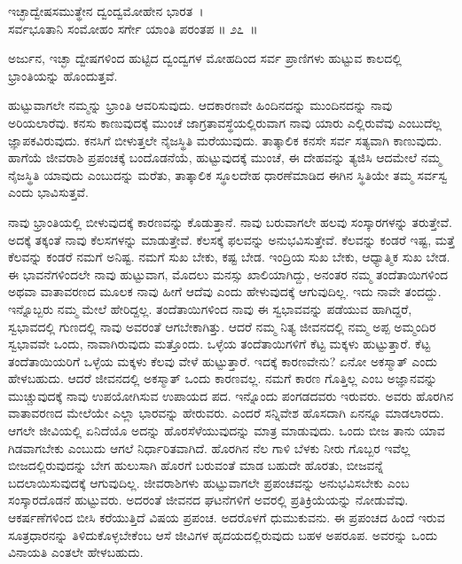 \begin{shloka}
ಇಚ್ಛಾದ್ವೇಷಸಮುತ್ಥೇನ ದ್ವಂದ್ವಮೋಹೇನ ಭಾರತ~।\\ಸರ್ವಭೂತಾನಿ ಸಂಮೋಹಂ ಸರ್ಗೇ ಯಾಂತಿ ಪರಂತಪ \hfill॥ ೨೭~॥
\end{shloka}

\begin{artha}
ಅರ್ಜುನ, ಇಚ್ಛಾ ದ್ವೇಷಗಳಿಂದ ಹುಟ್ಟಿದ ದ್ವಂದ್ವಗಳ ಮೋಹದಿಂದ ಸರ್ವ ಪ್ರಾಣಿಗಳು ಹುಟ್ಟುವ ಕಾಲದಲ್ಲಿ ಭ್ರಾಂತಿಯನ್ನು ಹೊಂದುತ್ತವೆ.
\end{artha}

ಹುಟ್ಟುವಾಗಲೇ ನಮ್ಮನ್ನು ಭ್ರಾಂತಿ ಆವರಿಸುವುದು. ಆದಕಾರಣವೇ ಹಿಂದಿನದನ್ನು ಮುಂದಿನ\-ದನ್ನು ನಾವು ಅರಿಯಲಾರೆವು. ಕನಸು ಕಾಣುವುದಕ್ಕೆ ಮುಂಚೆ ಜಾಗ್ರತಾವಸ್ಥೆಯಲ್ಲಿರುವಾಗ ನಾವು ಯಾರು ಎಲ್ಲಿರುವೆವು ಎಂಬುದೆಲ್ಲ ಜ್ಞಾಪಕವಿರುವುದು. ಕನಸಿಗೆ ಬೀಳುತ್ತಲೇ ನೈಜಸ್ಥಿತಿ ಮರೆಯುವುದು. ತಾತ್ಕಾಲಿಕ ಕನಸೇ ಸರ್ವ ಸತ್ಯವಾಗಿ ಕಾಣುವುದು. ಹಾಗೆಯೆ ಜೀವರಾಶಿ ಪ್ರಪಂಚಕ್ಕೆ ಬಂದೊಡನೆಯೆ, ಹುಟ್ಟುವುದಕ್ಕೆ ಮುಂಚೆ, ಈ ದೇಹವನ್ನು ತ್ಯಜಿಸಿ ಆದಮೇಲೆ ನಮ್ಮ ನೈಜಸ್ಥಿತಿ ಯಾವುದು ಎಂಬುದನ್ನು ಮರೆತು, ತಾತ್ಕಾಲಿಕ ಸ್ಥೂಲದೇಹ ಧಾರಣೆಮಾಡಿದ ಈಗಿನ ಸ್ಥಿತಿಯೇ ತಮ್ಮ ಸರ್ವಸ್ವ ಎಂದು ಭಾವಿಸುತ್ತವೆ.

ನಾವು ಭ್ರಾಂತಿಯಲ್ಲಿ ಬೀಳುವುದಕ್ಕೆ ಕಾರಣವನ್ನು ಕೊಡುತ್ತಾನೆ. ನಾವು ಬರುವಾಗಲೇ ಹಲವು ಸಂಸ್ಕಾರಗಳನ್ನು ತರುತ್ತೇವೆ. ಅದಕ್ಕೆ ತಕ್ಕಂತೆ ನಾವು ಕೆಲಸಗಳನ್ನು ಮಾಡುತ್ತೇವೆ. ಕೆಲಸಕ್ಕೆ ಫಲವನ್ನು ಅನುಭವಿಸುತ್ತೇವೆ. ಕೆಲವನ್ನು ಕಂಡರೆ ಇಷ್ಟ, ಮತ್ತೆ ಕೆಲವನ್ನು ಕಂಡರೆ ನಮಗೆ ಅನಿಷ್ಟ. ನಮಗೆ ಸುಖ ಬೇಕು, ಕಷ್ಟ ಬೇಡ. ಇಂದ್ರಿಯ ಸುಖ ಬೇಕು, ಆಧ್ಯಾತ್ಮಿಕ ಸುಖ ಬೇಡ. ಈ ಭಾವನೆಗಳಿಂದಲೇ ನಾವು ಹುಟ್ಟುವಾಗ, ಮೊದಲು ಮನಸ್ಸು ಖಾಲಿಯಾಗಿದ್ದು, ಅನಂತರ ನಮ್ಮ ತಂದೆತಾಯಿಗಳಿಂದ ಅಥವಾ ವಾತಾವರಣದ ಮೂಲಕ ನಾವು ಹೀಗೆ ಆದೆವು ಎಂದು ಹೇಳುವುದಕ್ಕೆ ಆಗುವುದಿಲ್ಲ. ಇದು ನಾವೇ ತಂದದ್ದು. ಇನ್ನೊಬ್ಬರು ನಮ್ಮ ಮೇಲೆ ಹೇರಿದ್ದಲ್ಲ. ತಂದೆತಾಯಿಗಳಿಂದ ನಾವು ಈ ಸ್ವಭಾವವನ್ನು ಪಡೆಯುವ ಹಾಗಿದ್ದರೆ, ಸ್ವಭಾವದಲ್ಲಿ ಗುಣದಲ್ಲಿ ನಾವು ಅವರಂತೆ ಆಗಬೇಕಾಗಿತ್ತು. ಆದರೆ ನಮ್ಮ ನಿತ್ಯ ಜೀವನದಲ್ಲಿ ನಮ್ಮ ಅಪ್ಪ ಅಮ್ಮಂದಿರ ಸ್ವಭಾವವೇ ಒಂದು, ನಾವಾಗಿರುವುದು ಮತ್ತೊಂದು. ಒಳ್ಳೆಯ ತಂದೆತಾಯಿಗಳಿಗೆ ಕೆಟ್ಟ ಮಕ್ಕಳು ಹುಟ್ಟುತ್ತಾರೆ. ಕೆಟ್ಟ ತಂದೆತಾಯಿಯರಿಗೆ ಒಳ್ಳೆಯ ಮಕ್ಕಳು ಕೆಲವು ವೇಳೆ ಹುಟ್ಟುತ್ತಾರೆ. ಇದಕ್ಕೆ ಕಾರಣವೇನು? ಏನೋ ಅಕಸ್ಮಾತ್ ಎಂದು ಹೇಳಬಹುದು. ಆದರೆ ಜೀವನದಲ್ಲಿ ಅಕಸ್ಮಾತ್ ಒಂದು ಕಾರಣವಲ್ಲ. ನಮಗೆ ಕಾರಣ ಗೊತ್ತಿಲ್ಲ ಎಂಬ ಅಜ್ಞಾನವನ್ನು ಮುಚ್ಚುವುದಕ್ಕೆ ನಾವು ಉಪಯೋಗಿಸುವ ಉಪಾಯದ ಪದ. ಇನ್ನೊಂದು ಪಂಗಡದವರು ಇರುವರು. ಅವರು ಹೊರಗಿನ ವಾತಾವರಣದ ಮೇಲೆಯೇ ಎಲ್ಲಾ ಭಾರವನ್ನು ಹೇರುವರು. ಎಂದರೆ ಸನ್ನಿವೇಶ ಹೊಸದಾಗಿ ಏನನ್ನೂ ಮಾಡಲಾರದು. ಆಗಲೇ ಜೀವಿಯಲ್ಲಿ ಏನಿದೆಯೊ ಅದನ್ನು ಹೊರಸೆಳೆಯುವುದನ್ನು ಮಾತ್ರ ಮಾಡುವುದು. ಒಂದು ಬೀಜ ತಾನು ಯಾವ ಗಿಡವಾಗಬೇಕು ಎಂಬುದು ಆಗಲೆ ನಿರ್ಧಾರಿತವಾಗಿದೆ. ಹೊರಗಿನ ನೆಲ ಗಾಳಿ ಬೆಳಕು ನೀರು ಗೊಬ್ಬರ ಇವೆಲ್ಲ ಬೀಜದಲ್ಲಿರುವುದನ್ನು ಬೇಗ ಹುಲುಸಾಗಿ ಹೊರಗೆ ಬರುವಂತೆ ಮಾಡ ಬಹುದೇ ಹೊರತು, ಬೀಜವನ್ನೆ ಬದಲಾಯಿಸುವುದಕ್ಕೆ ಆಗುವುದಿಲ್ಲ. ಜೀವರಾಶಿಗಳು ಹುಟ್ಟುವಾಗಲೇ ಪ್ರಪಂಚವನ್ನು ಅನುಭವಿಸಬೇಕು ಎಂಬ ಸಂಸ್ಕಾರದೊಡನೆ ಹುಟ್ಟುವರು. ಅದರಂತೆ ಜೀವನದ ಘಟನೆಗಳಿಗೆ ಅವರಲ್ಲಿ ಪ್ರತಿಕ್ರಿಯೆಯನ್ನು ನೋಡುವೆವು. ಆಕರ್ಷಣೆಗಳಿಂದ ಬೀಸಿ ಕರೆಯುತ್ತಿದೆ ವಿಷಯ ಪ್ರಪಂಚ. ಅದರೊಳಗೆ ಧುಮುಕುವನು. ಈ ಪ್ರಪಂಚದ ಹಿಂದೆ ಇರುವ ಸೂತ್ರಧಾರನನ್ನು ತಿಳಿದುಕೊಳ್ಳಬೇಕೆಂಬ ಆಸೆ ಜೀವಿಗಳ ಹೃದಯದಲ್ಲಿರುವುದು ಬಹಳ ಅಪರೂಪ. ಅವರನ್ನು ಒಂದು ವಿನಾಯತಿ  ಎಂತಲೇ ಹೇಳಬಹುದು.

